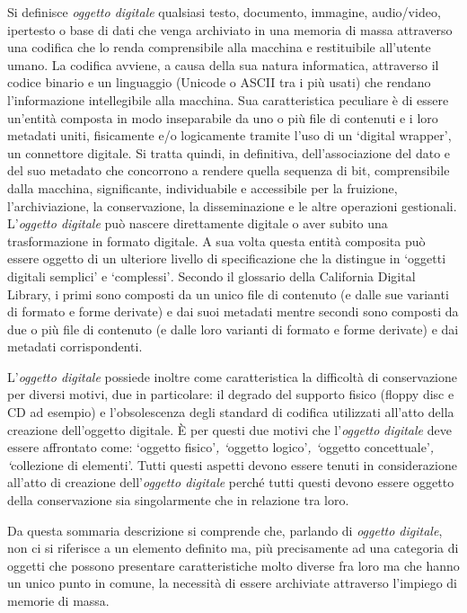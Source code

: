 Si definisce \emph{oggetto digitale} qualsiasi testo, documento,
immagine, audio/video, ipertesto o base di dati che venga archiviato in
una memoria di massa attraverso una codifica che lo renda comprensibile
alla macchina e restituibile all'utente umano. La codifica avviene, a
causa della sua natura informatica, attraverso il codice binario e un
linguaggio (Unicode o ASCII tra i più usati) che rendano l'informazione
intellegibile alla macchina. Sua caratteristica peculiare è di essere
un'entità composta in modo inseparabile da uno o più file di contenuti e
i loro metadati uniti, fisicamente e/o logicamente tramite l'uso di un
`digital wrapper', un connettore digitale. Si tratta quindi, in
definitiva, dell'associazione del dato e del suo metadato che concorrono
a rendere quella sequenza di bit, comprensibile dalla macchina,
significante, individuabile e accessibile per la fruizione,
l'archiviazione, la conservazione, la disseminazione e le altre
operazioni gestionali. L'\emph{oggetto digitale} può nascere
direttamente digitale o aver subito una trasformazione in formato
digitale. A sua volta questa entità composita può essere oggetto di un
ulteriore livello di specificazione che la distingue in `oggetti
digitali semplici' e `complessi'\emph{.} Secondo il glossario della
California Digital Library, i primi sono composti da un unico file di
contenuto (e dalle sue varianti di formato e forme derivate) e dai suoi
metadati mentre secondi sono composti da due o più file di contenuto (e
dalle loro varianti di formato e forme derivate) e dai metadati
corrispondenti.

L'\emph{oggetto digitale} possiede inoltre come caratteristica la
difficoltà di conservazione per diversi motivi, due in particolare: il
degrado del supporto fisico (floppy disc e CD ad esempio) e
l'obsolescenza degli standard di codifica utilizzati all'atto della
creazione dell'oggetto digitale. È per questi due motivi che
l'\emph{oggetto} \emph{digitale} deve essere affrontato come: `oggetto
fisico'\emph{, `}oggetto logico'\emph{, `}oggetto concettuale'\emph{,
`}collezione di elementi'. Tutti questi aspetti devono essere tenuti in
considerazione all'atto di creazione dell'\emph{oggetto digitale} perché
tutti questi devono essere oggetto della conservazione sia singolarmente
che in relazione tra loro.

Da questa sommaria descrizione si comprende che, parlando di
\emph{oggetto digitale}, non ci si riferisce a un elemento definito ma,
più precisamente ad una categoria di oggetti che possono presentare
caratteristiche molto diverse fra loro ma che hanno un unico punto in
comune, la necessità di essere archiviate attraverso l'impiego di
memorie di massa.

